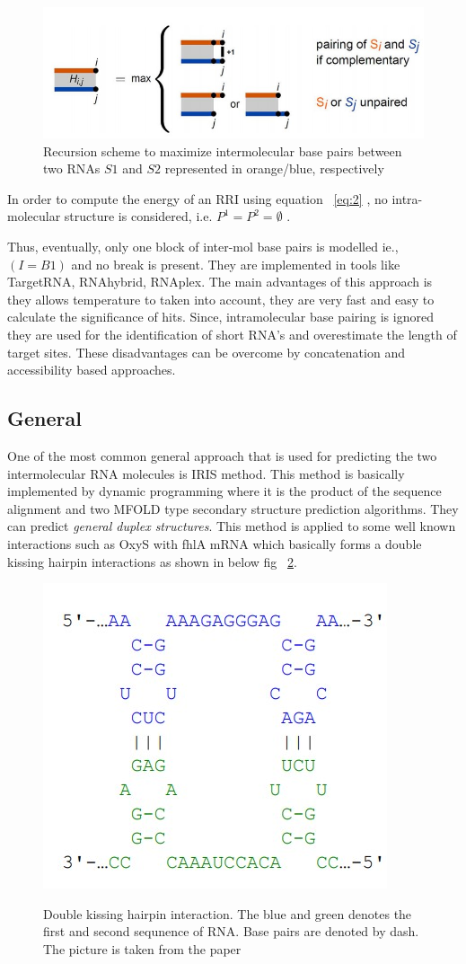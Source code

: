 \documentclass[twoside,a4paper]{report}
\begin{document}
	 \begin{figure}[tb]
		\includegraphics[width=0.8\linewidth]{hybrid}
		\centering
		\caption{Recursion scheme to maximize intermolecular base pairs between two RNAs $S1$ and $S2$ represented in orange/blue, respectively} 
		\label{fig:hybrid}
	\end{figure}

	In order to compute the energy of an RRI using equation ~\ref{eq:2} , no intra-molecular structure is considered, i.e. $P^1=P^2= \emptyset $ .
	
	Thus, eventually, only one block of inter-mol base pairs is modelled ie., $(I = B1)$ and no break is present. They are implemented in tools like TargetRNA, RNAhybrid, RNAplex. The main advantages of this approach is they allows temperature to taken into account, they are very fast and easy to calculate the significance of hits.  Since,  intramolecular base pairing is ignored they are used for the identification of short RNA's and overestimate the length of target sites. These disadvantages can be overcome by concatenation and accessibility based approaches.\\ 
	
	\subsection{General}
	One of the most common general approach that is used for predicting the two intermolecular RNA molecules is IRIS \citep{pervouchine2004iris} method. This method is basically implemented by dynamic programming where it is the product of the sequence alignment and two MFOLD type secondary structure prediction algorithms. They can predict \textit{general duplex structures}. This method is applied to some well known interactions such as OxyS with fhlA mRNA which basically forms a double kissing hairpin interactions as shown in below fig ~\ref{fig:doublekiss}.\\
	
	 \begin{figure}[tb]
		\includegraphics[width=0.4\linewidth]{doublekiss}
		\centering
		\caption{ Double kissing hairpin interaction. The blue and green denotes the first and second sequnence of RNA. Base pairs are denoted by dash. The picture is taken from the paper } 
		\citep{wright2018structure}
		\label{fig:doublekiss}
	\end{figure}
	
\end{document}
